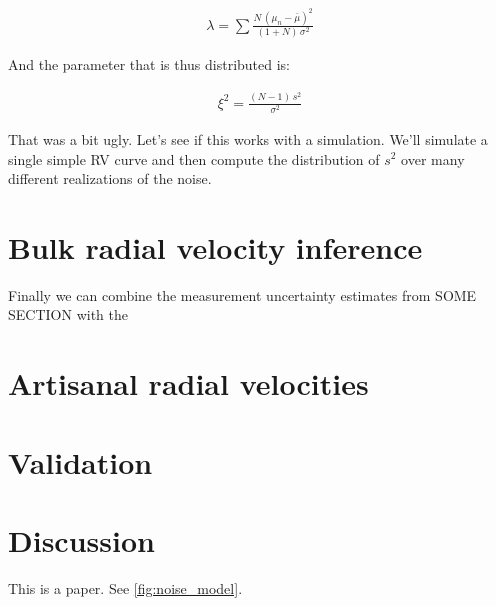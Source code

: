 \documentclass[modern, letterpaper]{aastex631}
\begin{document}
\begin{eqnarray}
	\lambda = \sum \frac{N\,(\mu_n - \bar{\mu})^2}{(1 + N)\,\sigma^2}
\end{eqnarray}

And the parameter that is thus distributed is:

\begin{eqnarray}
	\xi^2 = \frac{(N - 1)\,s^2}{\sigma^2}
\end{eqnarray}

That was a bit ugly.
Let's see if this works with a simulation.
We'll simulate a single simple RV curve and then compute the distribution of $s^2$ over many different realizations of the noise.

\section{Bulk radial velocity inference}

Finally we can combine the measurement uncertainty estimates from SOME SECTION with the

\section{Artisanal radial velocities}

\section{Validation}

\section{Discussion}

This is a paper.
See \autoref{fig:noise_model}.



\end{document}

